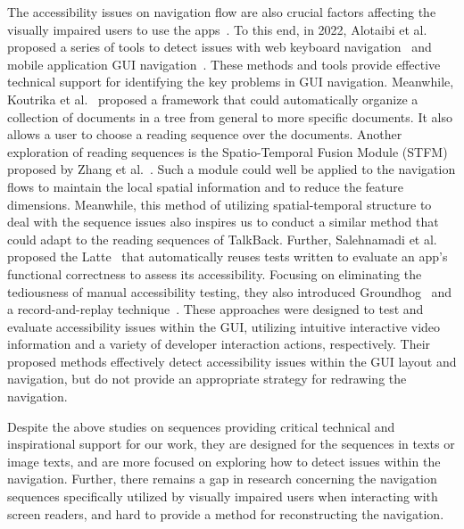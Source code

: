 The accessibility issues on navigation flow are also crucial factors affecting the visually impaired users to use the apps~\cite{Milne2018Blocks4AllOA, Hara2013CombiningCA, Bigham2010AccessibilityBD}.
To this end, in 2022, Alotaibi et al. proposed a series of tools to detect issues with web keyboard navigation~\cite{Chiou2023DetectingDK, Chiou2023BAGELAA} and mobile application GUI navigation~\cite{Alotaibi2022AutomatedDO}.
These methods and tools provide effective technical support for identifying the key problems in GUI navigation.
Meanwhile, Koutrika et al.~\cite{Koutrika2015GeneratingRO} proposed a framework that could automatically organize a collection of documents in a tree from general to more specific documents.
It also allows a user to choose a reading sequence over the documents.
Another exploration of reading sequences is the Spatio-Temporal Fusion Module (STFM) proposed by Zhang et al.~\cite{Zhang2019SpatioTemporalFB}.
Such a module could well be applied to the navigation flows to maintain the local spatial information and to reduce the feature dimensions.
Meanwhile, this method of utilizing spatial-temporal structure to deal with the sequence issues also inspires us to conduct a similar method that could adapt to the reading sequences of TalkBack.
Further, Salehnamadi et al. proposed the Latte~\cite{Salehnamadi2021LatteUA} that automatically reuses tests written to evaluate an app’s functional correctness to assess its accessibility.
Focusing on eliminating the tediousness of manual accessibility testing, they also introduced Groundhog~\cite{Salehnamadi2022GroundhogAA} and a record-and-replay technique~\cite{Salehnamadi2023AssistiveTechnologyAM}.
These approaches were designed to test and evaluate accessibility issues within the GUI, utilizing intuitive interactive video information and a variety of developer interaction actions, respectively.
Their proposed methods effectively detect accessibility issues within the GUI layout and navigation, but do not provide an appropriate strategy for redrawing the navigation.

Despite the above studies on sequences providing critical technical and inspirational support for our work, they are designed for the sequences in texts or image texts, and are more focused on exploring how to detect issues within the navigation.
Further, there remains a gap in research concerning the navigation sequences specifically utilized by visually impaired users when interacting with screen readers, and hard to provide a method for reconstructing the navigation.